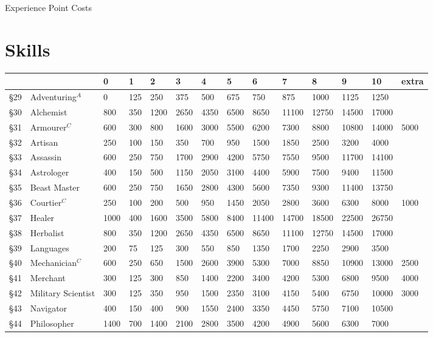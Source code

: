 \begin{Table}{Experience Point Costs}
\section{Skills}

\begin{tabularx}{\linewidth}{llllllllllllll} \hline
	&			& 0	& 1	& 2	& 3	& 4	& 5	& 6	& 7	& 8	& 9	& 10	& extra \\ \hline
§29	& Adventuring$^A$	& 0	& 125	& 250	& 375	& 500	& 675	& 750	& 875	& 1000	& 1125	& 1250	&	\\
§30	& Alchemist		& 800	& 350	& 1200	& 2650	& 4350	& 6500	& 8650	& 11100	& 12750	& 14500	& 17000	&	\\
§31	& Armourer$^C$		& 600	& 300	& 800	& 1600	& 3000	& 5500	& 6200	& 7300	& 8800	& 10800	& 14000	& 5000	\\
§32	& Artisan		& 250	& 100	& 150	& 350	& 700	& 950	& 1500	& 1850	& 2500	& 3200	& 4000	&	\\
§33	& Assassin		& 600	& 250	& 750	& 1700	& 2900	& 4200	& 5750	& 7550	& 9500	& 11700	& 14100	&	\\
§34	& Astrologer		& 400	& 150	& 500	& 1150	& 2050	& 3100	& 4400	& 5900	& 7500	& 9400	& 11500	&	\\
§35	& Beast Master		& 600	& 250	& 750	& 1650	& 2800	& 4300	& 5600	& 7350	& 9300	& 11400	& 13750	&	\\
§36	& Courtier$^C$		& 250	& 100	& 200	& 500	& 950	& 1450	& 2050	& 2800	& 3600	& 6300	& 8000	& 1000	\\
§37	& Healer		& 1000	& 400	& 1600	& 3500	& 5800	& 8400	& 11400	& 14700	& 18500	& 22500	& 26750	&	\\
§38	& Herbalist		& 800	& 350	& 1200	& 2650	& 4350	& 6500	& 8650	& 11100	& 12750	& 14500	& 17000	&	\\
§39	& Languages		& 200	& 75	& 125	& 300	& 550	& 850	& 1350	& 1700	& 2250	& 2900	& 3500	&	\\
§40	& Mechanician$^C$	& 600	& 250	& 650	& 1500	& 2600	& 3900	& 5300	& 7000	& 8850	& 10900	& 13000	& 2500	\\
§41	& Merchant		& 300	& 125	& 300	& 850	& 1400	& 2200	& 3400	& 4200	& 5300	& 6800	& 9500	& 4000	\\
§42	& Military Scientist	& 300	& 125	& 350	& 950	& 1500	& 2350	& 3100	& 4150	& 5400	& 6750	& 10000	& 3000	\\
§43	& Navigator		& 400	& 150	& 400	& 900	& 1550	& 2400	& 3350	& 4450	& 5750	& 7100	& 10500	&	\\
§44	& Philosopher		& 1400	& 700	& 1400	& 2100	& 2800	& 3500	& 4200	& 4900	& 5600	& 6300	& 7000	&	\\

\end{tabularx}
\end{Table}
